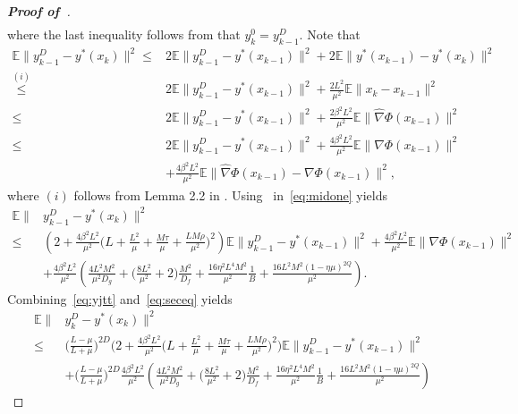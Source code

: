 \documentclass{osudissert96}
\begin{document}
\begin{proof}[\bf Proof of~]
\begin{align}
\end{align} 
where the last inequality follows from  that $y_k^0=y^{D}_{k-1}$. Note that 
\begin{align}\label{eq:midone}
\mathbb{E}\|y^D_{k-1}-y^*(x_k)\|^2 \leq &2\mathbb{E}\|y^D_{k-1}-y^*(x_{k-1})\|^2 + 2\mathbb{E}\|y^*(x_{k-1})-y^*(x_k)\|^2 \nonumber
\\\overset{(i)}\leq& 2\mathbb{E}\|y^D_{k-1}-y^*(x_{k-1})\|^2 +\frac{2L^2}{\mu^2} \mathbb{E}\|x_k-x_{k-1}\|^2 \nonumber
\\ \leq & 2\mathbb{E}\|y^D_{k-1}-y^*(x_{k-1})\|^2 +\frac{2\beta^2L^2}{\mu^2} \mathbb{E}\|\widehat \nabla \Phi(x_{k-1})\|^2 \nonumber
\\\leq & 2\mathbb{E}\|y^D_{k-1}-y^*(x_{k-1})\|^2  + \frac{4\beta^2L^2}{\mu^2} \mathbb{E}\|\nabla \Phi(x_{k-1})\|^2 \nonumber
\\&+\frac{4\beta^2L^2}{\mu^2} \mathbb{E}\|\widehat \nabla \Phi(x_{k-1})-\nabla \Phi(x_{k-1})\|^2,
\end{align}
where $(i)$ follows from Lemma 2.2 in \cite{ghadimi2018approximation}. Using~ in~\cref{eq:midone} yields
{\small
\begin{align}\label{eq:seceq}
\mathbb{E}\|&y^D_{k-1}-y^*(x_k)\|^2  \nonumber
\\\leq& \left(2+  \frac{4\beta^2L^2}{\mu^2}  \Big( L+\frac{L^2}{\mu} + \frac{M\tau}{\mu}+\frac{LM\rho}{\mu^2}\Big)^2  \right)\mathbb{E}\|y^D_{k-1}-y^*(x_{k-1})\|^2+ \frac{4\beta^2L^2}{\mu^2} \mathbb{E}\|\nabla \Phi(x_{k-1})\|^2  \nonumber
\\&+  \frac{4\beta^2L^2}{\mu^2} \left( \frac{4L^2M^2}{\mu^2D_g} + \Big(\frac{8L^2}{\mu^2} + 2\Big) \frac{M^2}{D_f}+ \frac{16\eta^2  L^4M^2}{\mu^2} \frac{1}{B}+\frac{16 L^2M^2(1-\eta \mu)^{2Q}}{\mu^2}  \right).
\end{align}}
\hspace{-0.15cm}Combining~\cref{eq:yjtt} and~\cref{eq:seceq} yields
{\small
\begin{align}\label{eq:enroll}
\mathbb{E}\|&y_k^{D}-y^*(x_k) \|^2  \nonumber
\\\leq&  \Big(\frac{L-\mu}{L+\mu}\Big)^{2D} \Big(2+  \frac{4\beta^2L^2}{\mu^2}  \Big( L+\frac{L^2}{\mu} + \frac{M\tau}{\mu}+\frac{LM\rho}{\mu^2}\Big)^2  \Big)\mathbb{E}\|y^D_{k-1}-y^*(x_{k-1})\|^2 \nonumber
\\&+ \Big(\frac{L-\mu}{L+\mu}\Big)^{2D} \frac{4\beta^2L^2}{\mu^2} \left( \frac{4L^2M^2}{\mu^2D_g} + \Big(\frac{8L^2}{\mu^2} + 2\Big) \frac{M^2}{D_f}+ \frac{16\eta^2  L^4M^2}{\mu^2} \frac{1}{B}+\frac{16 L^2M^2(1-\eta \mu)^{2Q}}{\mu^2}  \right)\nonumber

\end{align}}
\end{proof}
\end{document}
